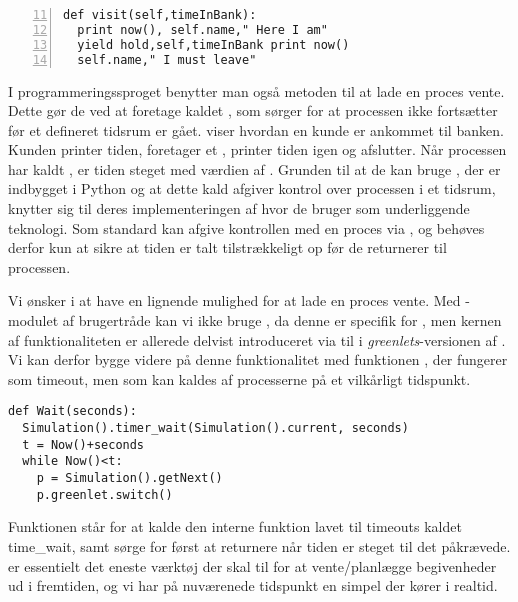 \begin{lstlisting}[firstnumber=11 , stepnumber=2, numbers=left,float=hbtp, label=fig:simpy:yield, caption= Et yield i \simpy (Taget fra Bank05.py i eksemplet fra \simpy)] 
def visit(self,timeInBank): 
  print now(), self.name," Here I am" 
  yield hold,self,timeInBank print now()
  self.name," I must leave" 
\end{lstlisting}
I programmeringssproget \simpy benytter man også metoden til at lade en proces vente. Dette gør de ved at
foretage kaldet , som sørger for at processen ikke
fortsætter før et defineret tidsrum er gået.  viser hvordan en kunde er ankommet til banken. Kunden printer tiden, foretager et , printer tiden igen og afslutter.  Når processen har kaldt , er tiden steget med værdien af . Grunden til at de kan bruge , der er indbygget i Python og at dette kald afgiver kontrol over processen i et tidsrum, knytter sig til deres implementeringen af \simpy hvor de bruger   som underliggende teknologi. Som standard kan   afgive kontrollen med en proces via , og \simpy behøves derfor kun at sikre at tiden er talt tilstrækkeligt op før de returnerer til processen.

 Vi ønsker i \pycsp at have en lignende mulighed for at lade en proces vente. Med -modulet af brugertråde kan vi ikke bruge , da denne er specifik for , men kernen af funktionaliteten er allerede delvist introduceret via  til  i \emph{greenlets}-versionen af \pycsp. Vi kan derfor bygge videre på denne funktionalitet med funktionen , der fungerer som timeout, men som kan kaldes af processerne på et vilkårligt tidspunkt.

\begin{lstlisting}[firstnumber=20,float=hbtp, label=fig:wait, caption=Wait i \code{simulering}-versionen.] 
def Wait(seconds):
  Simulation().timer_wait(Simulation().current, seconds)
  t = Now()+seconds
  while Now()<t:
    p = Simulation().getNext() 
    p.greenlet.switch()
\end{lstlisting}

Funktionen  står for at kalde den interne funktion lavet til timeouts kaldet time\_wait, samt sørge for først at returnere når tiden er steget til det påkrævede.  er essentielt det eneste værktøj der skal til for at vente/planlægge begivenheder ud i fremtiden, og vi har på nuværenede tidspunkt en simpel \des der kører i realtid. 

